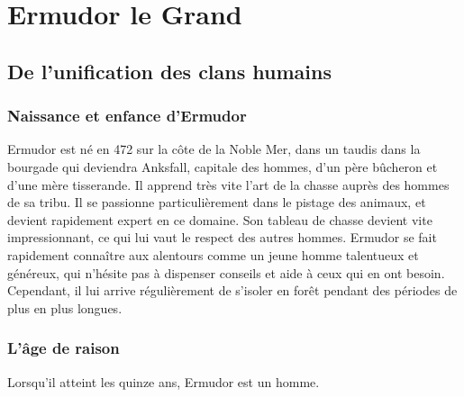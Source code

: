 
\section{Ermudor le Grand}
\subsection{De l'unification des clans humains}
\subsubsection{Naissance et enfance d'Ermudor}
Ermudor est né en 472 sur la côte de la Noble Mer, dans un taudis dans la bourgade qui deviendra Anksfall, capitale des hommes, d'un père bûcheron et d'une mère tisserande. Il apprend très vite l'art de la chasse auprès des hommes de sa tribu. Il se passionne particulièrement dans le pistage des animaux, et devient rapidement expert en ce domaine. Son tableau de chasse devient vite impressionnant, ce qui lui vaut le respect des autres hommes. Ermudor se fait rapidement connaître aux alentours comme un jeune homme talentueux et généreux, qui n'hésite pas à dispenser conseils et aide à ceux qui en ont besoin. Cependant, il lui arrive régulièrement de s'isoler en forêt pendant des périodes de plus en plus longues.
\subsubsection{L'âge de raison}
Lorsqu'il atteint les quinze ans, Ermudor est un homme. 